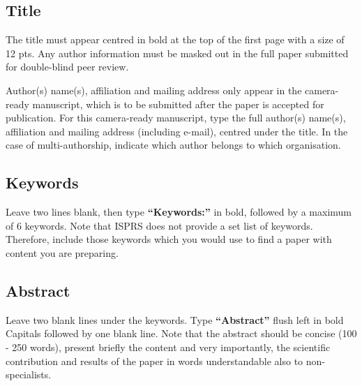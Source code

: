 \documentclass{isprs} %
\begin{document}
\subsection{Title}\label{sec:Title}

The title must appear centred in bold at the top of the first page with a size of 12 pts. Any author information must be masked out in the full paper submitted for double-blind peer review.

Author(s) name(s), affiliation and mailing address only appear in the camera-ready manuscript, which is to be submitted after the paper is accepted for publication. For this camera-ready manuscript, type the full author(s) name(s), affiliation and mailing address (including e-mail), centred under the title. In the case of multi-authorship, indicate which author belongs to which organisation.





\subsection{Keywords}\label{sec:Keywords}

Leave two lines blank, then type \textbf{``Keywords:''} in bold, followed by a maximum of 6 keywords. Note that ISPRS does not provide a set list of keywords. Therefore, include those keywords which you would use to find a paper with content you are preparing.


\subsection{Abstract}\label{sec:Abstract}

Leave two blank lines under the keywords. Type \textbf{``Abstract''}
flush left in bold Capitals followed by one blank line. Note that the abstract should be concise (100 - 250 words), present briefly the content and very importantly, the scientific contribution and results of the paper in words understandable also to non-specialists.
\end{document}
